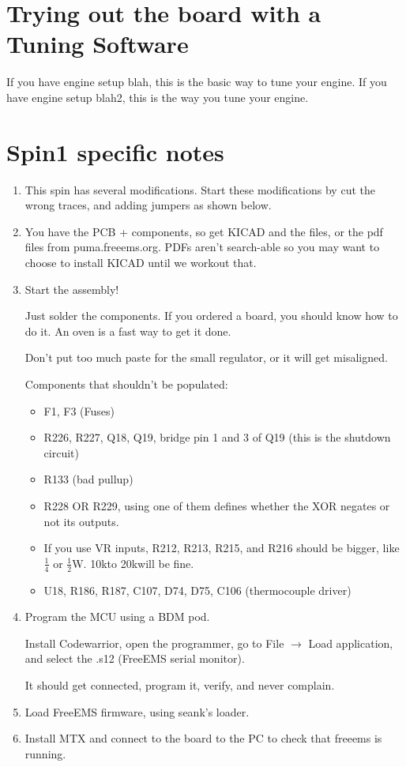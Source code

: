 \documentclass[12pt,a4paper,titlepage]{article}
\begin{document}
\section{Trying out the board with a Tuning Software}

If you have engine setup blah, this is the basic way to tune your engine.
If you have engine setup blah2, this is the way you tune your engine.

\section{Spin1 specific notes}

\begin{enumerate}
\item This spin has several modifications. Start these modifications by cut the wrong traces, and adding jumpers as shown below.

\item You have the PCB + components, so get KICAD and the files, or the pdf files from puma.freeems.org. PDFs aren't search-able so you may want to choose to install KICAD until we workout that.

\item Start the assembly!

Just solder the components. If you ordered a board, you should know how to do it. An oven is a fast way to get it done.

Don't put too much paste for the small regulator, or it will get misaligned.

Components that shouldn't be populated:

\begin{itemize}
\item F1, F3 (Fuses)
\item R226, R227, Q18, Q19, bridge pin 1 and 3 of Q19 (this is the shutdown circuit)
\item R133 (bad pullup)
\item R228 OR R229, using one of them defines whether the XOR negates or not its outputs.
\item If you use VR inputs, R212, R213, R215, and R216 should be bigger, like $\frac{1}{4}$ or $\frac{1}{2}$W. 10k\ohm to 20k\ohm will be fine.
\item U18, R186, R187, C107, D74, D75, C106 (thermocouple driver)
\end{itemize}

\item Program the MCU using a BDM pod.

Install Codewarrior, open the programmer, go to File $\rightarrow$ Load application, and select the .s12 (FreeEMS serial monitor).

It should get connected, program it, verify, and never complain.

\item Load FreeEMS firmware, using seank's loader.

\item Install  MTX and connect to the board to the PC to check that freeems is running.

\end{enumerate}
\end{document}
